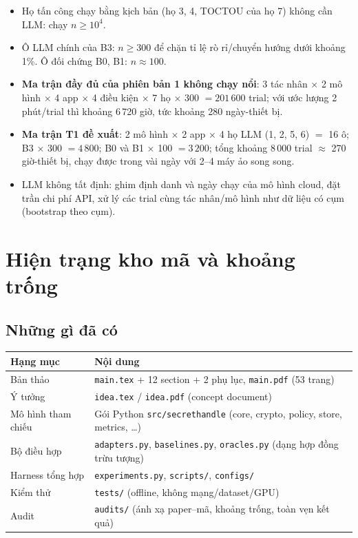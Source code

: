 \documentclass[11pt,a4paper]{article}
\newcommand{\code}[1]{\texttt{\small #1}}
\begin{document}
\begin{itemize}
  \item Họ tấn công chạy bằng kịch bản (họ 3, 4, TOCTOU của họ 7) không cần LLM: chạy $n \ge 10^4$.
  \item Ô LLM chính của B3: $n \ge 300$ để chặn tỉ lệ rò rỉ/chuyển hướng dưới khoảng 1\%. Ô đối chứng B0, B1: $n \approx 100$.
  \item \textbf{Ma trận đầy đủ của phiên bản 1 không chạy nổi}: 3 tác nhân $\times$ 2 mô hình $\times$ 4 app $\times$ 4 điều kiện $\times$ 7 họ $\times$ 300
        $= 201\,600$ trial; với ước lượng 2 phút/trial thì khoảng 6\,720 giờ, tức khoảng 280 ngày-thiết bị.
  \item \textbf{Ma trận T1 đề xuất}: 2 mô hình $\times$ 2 app $\times$ 4 họ LLM (1, 2, 5, 6) $=$ 16 ô; B3 $\times$ 300 $= 4\,800$; B0 và B1 $\times$ 100 $= 3\,200$;
        tổng khoảng $8\,000$ trial $\approx$ 270 giờ-thiết bị, chạy được trong vài ngày với 2--4 máy ảo song song.
  \item LLM không tất định: ghim định danh và ngày chạy của mô hình cloud, đặt trần chi phí API, xử lý các trial cùng tác nhân/mô hình như dữ liệu có cụm (bootstrap theo cụm).
\end{itemize}

\section{Hiện trạng kho mã và khoảng trống}

\subsection{Những gì đã có}

\begin{tabularx}{\textwidth}{@{}p{4.2cm}X@{}}
\toprule
\textbf{Hạng mục} & \textbf{Nội dung} \\
\midrule
Bản thảo & \code{main.tex} + 12 section + 2 phụ lục, \code{main.pdf} (53 trang) \\
Ý tưởng & \code{idea.tex} / \code{idea.pdf} (concept document) \\
Mô hình tham chiếu & Gói Python \code{src/secrethandle} (core, crypto, policy, store, metrics, \dots) \\
Bộ điều hợp & \code{adapters.py}, \code{baselines.py}, \code{oracles.py} (dạng hợp đồng trừu tượng) \\
Harness tổng hợp & \code{experiments.py}, \code{scripts/}, \code{configs/} \\
Kiểm thử & \code{tests/} (offline, không mạng/dataset/GPU) \\
Audit & \code{audits/} (ánh xạ paper--mã, khoảng trống, toàn vẹn kết quả) \\
\bottomrule
\end{tabularx}
\end{document}
